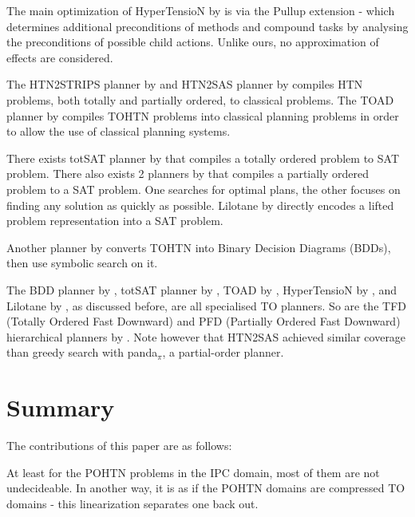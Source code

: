\documentclass[letterpaper]{article}
\begin{document}
The main optimization of HyperTensioN by \cite{hypertension} is via the Pullup extension - which determines additional preconditions of methods and compound tasks by analysing the preconditions of possible child actions. Unlike ours, no approximation of effects are considered.  

The HTN2STRIPS planner by \cite{HTN2STRIPS} and HTN2SAS planner by \cite{HTN2SAS} compiles HTN problems, both totally and partially ordered, to classical problems. The TOAD planner by \cite{HollerTOAD} compiles TOHTN problems into classical planning problems in order to allow the use of classical planning systems. %

There exists totSAT planner by \cite{TOtoSAT} that compiles a totally ordered problem to SAT problem. There also exists 2 planners by \cite{POtoSAT, OptimalPOtoSAT} that compiles a partially ordered problem to a SAT problem. One searches for optimal plans, the other focuses on finding any solution as quickly as possible. Lilotane by \cite{Lilotane} directly encodes a lifted problem representation into a SAT problem.

Another planner by \cite{Behnke_Speck_2021} converts TOHTN into Binary Decision Diagrams (BDDs), then use symbolic search on it.
 
The BDD planner by \cite{Behnke_Speck_2021}, totSAT planner by \cite{TOtoSAT}, TOAD by \cite{HollerTOAD}, HyperTensioN by \cite{hypertension}, and Lilotane by \cite{Lilotane}, as discussed before, are all specialised TO planners. So are the TFD (Totally Ordered Fast Downward) and PFD (Partially Ordered Fast Downward) hierarchical planners by \cite{PDDL4J}.  Note however that HTN2SAS achieved similar coverage than greedy search with panda$_\pi$, a partial-order planner.
 

\section{Summary}

The contributions of this paper are as follows:

At least for the POHTN problems in the IPC domain, most of them are not undecideable.
In another way, it is as if the POHTN domains are compressed TO domains - this linearization
separates one back out.
\end{document}
